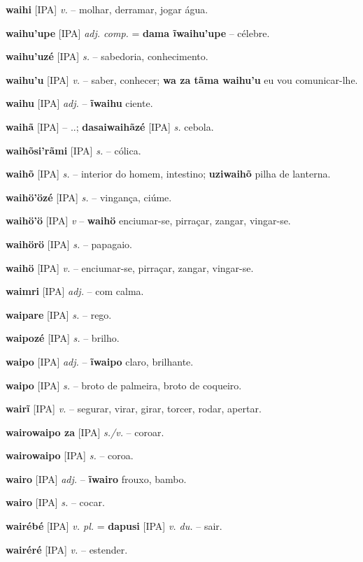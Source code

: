 \textbf{waihi} [IPA] \textit{v.} -- molhar, derramar, jogar água.

\textbf{waihu'upe} [IPA] \textit{adj. comp.} = \textbf{dama ĩwaihu'upe} -- célebre.

\textbf{waihu'uzé} [IPA] \textit{s.} -- sabedoria, conhecimento.

\textbf{waihu'u} [IPA] \textit{v.} -- saber, conhecer; \textbf{wa za tãma waihu'u} eu vou comunicar-lhe.

\textbf{waihu} [IPA] \textit{adj.} -- \textbf{ĩwaihu} ciente.

\textbf{waihã} [IPA] \textit{} -- ..; \textbf{dasaiwaihãzé} [IPA] \textit{s.} cebola.

\textbf{waihõsi'rãmi} [IPA] \textit{s.} -- cólica.

\textbf{waihõ} [IPA] \textit{s.} -- interior do homem, intestino; \textbf{uziwaihõ} pilha de lanterna.

\textbf{waihö'özé} [IPA] \textit{s.} -- vingança, ciúme.

\textbf{waihö'ö} [IPA] \textit{v} -- \textbf{waihö} enciumar-se, pirraçar, zangar, vingar-se.

\textbf{waihörö} [IPA] \textit{s.} -- papagaio.

\textbf{waihö} [IPA] \textit{v.} -- enciumar-se, pirraçar, zangar, vingar-se.

\textbf{waimri} [IPA] \textit{adj.} -- com calma.

\textbf{waipare} [IPA] \textit{s.} -- rego.

\textbf{waipozé} [IPA] \textit{s.} -- brilho.

\textbf{waipo} [IPA] \textit{adj.} -- \textbf{ĩwaipo} claro, brilhante.

\textbf{waipo} [IPA] \textit{s.} -- broto de palmeira, broto de coqueiro.

\textbf{wairĩ} [IPA] \textit{v.} -- segurar, virar, girar, torcer, rodar, apertar.

\textbf{wairowaipo za} [IPA] \textit{s./v.} -- coroar.

\textbf{wairowaipo} [IPA] \textit{s.} -- coroa.

\textbf{wairo} [IPA] \textit{adj.} -- \textbf{ĩwairo} frouxo, bambo.

\textbf{wairo} [IPA] \textit{s.} -- cocar.

\textbf{wairébé} [IPA] \textit{v. pl.} = \textbf{dapusi} [IPA] \textit{v. du.} -- sair.

\textbf{wairéré} [IPA] \textit{v.} -- estender.

